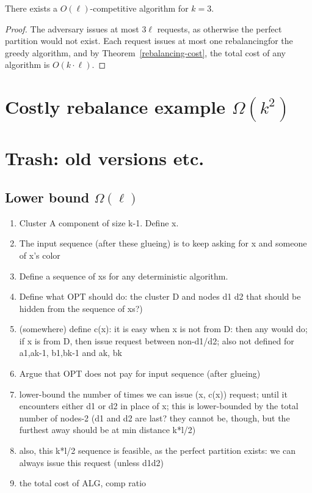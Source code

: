 \begin{theorem}
  There exists a $O(\ell)$-competitive algorithm for $k=3$.
\end{theorem}

\begin{proof}
  The adversary issues at most $3\ell$ requests, as otherwise the perfect partition would not exist. Each request issues at most one rebalancingfor the greedy algorithm, and by Theorem~\ref{rebalancing-cost}, the total cost of any algorithm is $O(k\cdot \ell)$.
\end{proof}

\section{Costly rebalance example $\Omega(k^2)$}


\section{Trash: old versions etc.}


\subsection{Lower bound $\Omega(\ell)$}

  \begin{enumerate}
    \item Cluster A component of size k-1. Define x.
    \item The input sequence (after these glueing) is to keep asking for x and someone of x's color
    \item Define a sequence of xs for any deterministic algorithm.
    \item Define what OPT should do: the cluster D and nodes d1 d2 that should be hidden from the sequence of xs?)
    \item (somewhere) define c(x): it is easy when x is not from D: then any would do; if x is from D, then issue request between non-d1/d2; also not defined for a1,ak-1, b1,bk-1 and ak, bk
    \item Argue that OPT does not pay for input sequence (after glueing)
    \item lower-bound the number of times we can issue (x, c(x)) request; until it encounters either d1 or d2 in place of x; this is lower-bounded by the total number of nodes-2 (d1 and d2 are last? they cannot be, though, but the furthest away should be at min distance k*l/2)
    \item also, this k*l/2 sequence is feasible, as the perfect partition exists: we can always issue this request (unless d1d2)
    \item the total cost of ALG, comp ratio
  \end{enumerate}


